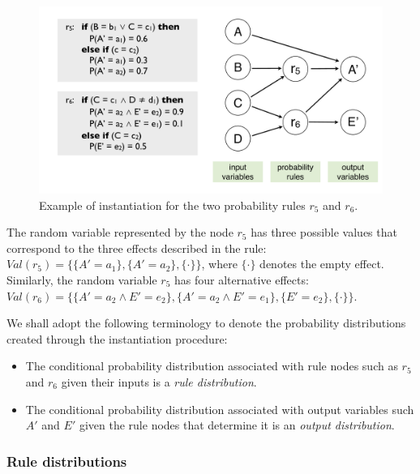 \begin{figure}[ht]
\centering
\includegraphics[scale=0.25]{imgs/ruleinstantiation.pdf}
\caption{Example of instantiation for the two probability rules $r_5$ and $r_6$. }
\label{fig:instantiationprob}
\end{figure}

The random variable represented by the node $r_5$ has three possible values that correspond to the three effects described in the rule: $\mathit{Val}(r_5) = \{ \{A'\!=\!a_1\}, \{A'\!=\!a_2\}, \{\cdot\}\}$, where $\{\cdot\}$ denotes the empty effect.  Similarly, the random variable $r_5$ has four alternative effects: $\mathit{Val}(r_6) = \{\{A'\!=\!a_2 \land E'\!=\!e_2\}, \{A'\!=\!a_2 \land E'\!=\!e_1\}, \{E'=e_2\}, \{\cdot\}\}$. 

We shall adopt the following terminology to denote the probability distributions created through the instantiation procedure: 
\begin{itemize}
\item The conditional probability distribution associated with rule nodes such as $r_5$ and $r_6$ given their inputs is a \textit{rule distribution}.
\item The conditional probability distribution associated with output variables such $A'$ and $E'$ given the rule nodes that determine it is an \textit{output distribution}.
\end{itemize}

\subsubsection*{Rule distributions}


